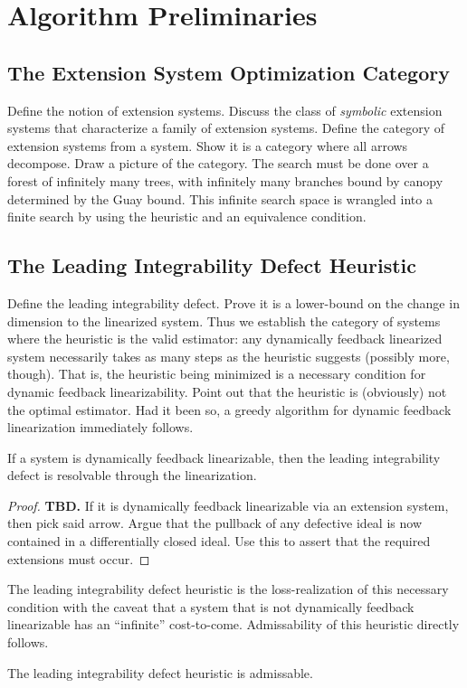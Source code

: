 \documentclass[review,hidelinks,onefignum,onetabnum]{siamart251216}
\begin{document}
\section{Algorithm Preliminaries}

\subsection{The Extension System Optimization Category}
Define the notion of extension systems.
Discuss the class of \emph{symbolic} extension systems that characterize a family of extension systems.
Define the category of extension systems from a system.
Show it is a category where all arrows decompose.
Draw a picture of the category.
The search must be done over a forest of infinitely many trees, with infinitely many branches bound by canopy determined by the Guay bound.
This infinite search space is wrangled into a finite search by using the heuristic and an equivalence condition.

\subsection{The Leading Integrability Defect Heuristic}
Define the leading integrability defect.
Prove it is a lower-bound on the change in dimension to the linearized system.
Thus we establish the category of systems where the heuristic is the valid estimator:
any dynamically feedback linearized system necessarily takes as many steps as the heuristic suggests (possibly more, though).
That is, the heuristic being minimized is a necessary condition for dynamic feedback linearizability.
Point out that the heuristic is (obviously) not the optimal estimator.
Had it been so, a greedy algorithm for dynamic feedback linearization immediately follows.

\begin{lemma}
  If a system is dynamically feedback linearizable, then the leading integrability defect is resolvable through the linearization.
\end{lemma}
\begin{proof}
  \textbf{TBD.}
  If it is dynamically feedback linearizable via an extension system, then pick said arrow.
  Argue that the pullback of any defective ideal is now contained in a differentially closed ideal.
  Use this to assert that the required extensions must occur.
\end{proof}
%
The leading integrability defect heuristic is the loss-realization of this necessary condition with the caveat that a system that is not dynamically feedback linearizable has an ``infinite'' cost-to-come.
Admissability of this heuristic directly follows.
%
\begin{corollary}
  The leading integrability defect heuristic is admissable.
\end{corollary}
\end{document}
